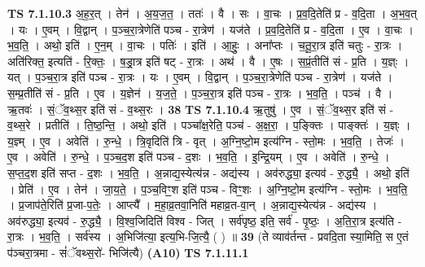 \documentclass[17pt]{extarticle}
\begin{document}
                  \newline
                                \textbf{ TS 7.1.10.3} \newline
                  अ॒ह॒र॒त् । तेन॑ । अ॒य॒ज॒त॒ । ततः॑ । वै । सः । वा॒चः । प्र॒व॒दि॒तेति॑ प्र - व॒दि॒ता । अ॒भ॒व॒त् । यः । ए॒वम् । वि॒द्वान् । प॒ञ्च॒रा॒त्रेणेति॑ पञ्च - रा॒त्रेण॑ । यज॑ते । प्र॒व॒दि॒तेति॑ प्र - व॒दि॒ता । ए॒व । वा॒चः । भ॒व॒ति॒ । अथो॒ इति॑ । ए॒न॒म् । वा॒चः । पतिः॑ । इति॑ । आ॒हुः॒ । अना᳚प्तः । च॒तू॒रा॒त्र इति॑ चतुः - रा॒त्रः । अति॑रिक्त॒ इत्यति॑ - रि॒क्तः॒ । ष॒ड्रा॒त्र इति॑ षट् - रा॒त्रः । अथ॑ । वै । ए॒षः । स॒प्रं॒तीति॑ सं - प्र॒ति । य॒ज्ञ्ः । यत् । प॒ञ्च॒रा॒त्र इति॑ पञ्च - रा॒त्रः । यः । ए॒वम् । वि॒द्वान् । प॒ञ्च॒रा॒त्रेणेति॑ पञ्च - रा॒त्रेण॑ । यज॑ते । स॒म्प्र॒तीति॑ सं - प्र॒ति । ए॒व । य॒ज्ञेन॑ । य॒ज॒ते॒ । प॒ञ्च॒रा॒त्र इति॑ पञ्च - रा॒त्रः । भ॒व॒ति॒ । पञ्च॑ । वै । ऋ॒तवः॑ । सं॒ॅव॒थ्स॒र इति॑ सं - व॒थ्स॒रः । \textbf{  38} \newline
                  \newline
                                \textbf{ TS 7.1.10.4} \newline
                  ऋ॒तुषु॑ । ए॒व । सं॒ॅव॒थ्स॒र इति॑ सं - व॒थ्स॒रे । प्रतीति॑ । ति॒ष्ठ॒न्ति॒ । अथो॒ इति॑ । पञ्चा᳚क्ष॒रेति॒ पञ्च॑ - अ॒क्ष॒रा॒ । प॒ङ्क्तिः । पाङ्क्तः॑ । य॒ज्ञ्ः । य॒ज्ञ्म् । ए॒व । अवेति॑ । रु॒न्धे॒ । त्रि॒वृदिति॑ त्रि - वृत् । अ॒ग्नि॒ष्टो॒म इत्य॑ग्नि - स्तो॒मः । भ॒व॒ति॒ । तेजः॑ । ए॒व । अवेति॑ । रु॒न्धे॒ । प॒ञ्च॒द॒श इति॑ पञ्च - द॒शः । भ॒व॒ति॒ । इ॒न्द्रि॒यम् । ए॒व । अवेति॑ । रु॒न्धे॒ । स॒प्त॒द॒श इति॑ सप्त - द॒शः । भ॒व॒ति॒ । अ॒न्नाद्य॒स्येत्य॑न्न - अद्य॑स्य । अव॑रुद्ध्या॒ इत्यव॑ - रु॒द्ध्यै॒ । अथो॒ इति॑ । प्रेति॑ । ए॒व । तेन॑ । जा॒य॒ते॒ । प॒ञ्च॒विꣳ॒॒श इति॑ पञ्च - विꣳ॒॒शः । अ॒ग्नि॒ष्टो॒म इत्य॑ग्नि - स्तो॒मः । भ॒व॒ति॒ । प्र॒जाप॑ते॒रिति॑ प्र॒जा-प॒तेः॒ । आप्त्यै᳚ । म॒हा॒व्र॒तवा॒निति॑ महाव्र॒त-वा॒न् । अ॒न्नाद्य॒स्येत्य॑न्न - अद्य॑स्य । अव॑रुद्ध्या॒ इत्यव॑ - रु॒द्ध्यै॒ । वि॒श्व॒जिदिति॑ विश्व - जित् । सर्व॑पृष्ठ॒ इति॒ सर्व॑ - पृ॒ष्ठः॒ । अ॒ति॒रा॒त्र इत्य॑ति - रा॒त्रः । भ॒व॒ति॒ । सर्व॑स्य । अ॒भिजि॑त्या॒ इत्य॒भि-जि॒त्यै॒ ( ) ॥ \textbf{  39} \newline
                  \newline
                      (ते व्याव॑र्तन्त - प्रवदि॒ता स्या॒मिति॒ स ए॒तं प॑ञ्चरा॒त्रमा - सं॑ॅवथ्स॒रो॑- भिजि॑त्यै)  \textbf{(A10)} \newline \newline
                                \textbf{ TS 7.1.11.1} \newline
\end{document}
